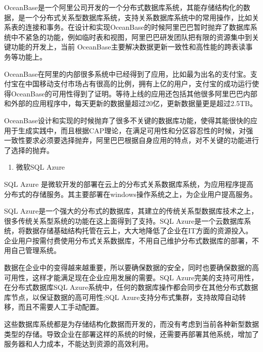 	
	OceanBase是一个阿里公司开发的一个分布式数据库系统，其能存储结构化的数据，是一个分布式关系型数据库系统，支持关系数据库系统中的常用操作，比如关系表的连接和事务。在设计和实现OceanBase的时候阿里巴巴暂时抛弃了数据库系统中不紧急的功能，例如临时表和视图，阿里巴巴研发团队把有限的资源集中到关键功能的开发上，当前 OceanBase主要解决数据更新一致性和高性能的跨表读事务等功能上。
	
	OceanBase在阿里的内部很多系统中已经得到了应用，比如最为出名的支付宝。支付宝在中国移动支付市场占有很高的比例，拥有上亿的用户，支付宝的成功运行使得OceanBase的可用性得到了证明。等待上线的应用还包括其他很多阿里巴巴内部和外部的应用程序中，每天更新的数据量超过20亿，更新数据量更是超过2.5TB。
	
	OceanBase设计和实现的时候抛弃了很多不关键的数据库功能，使得其能很快的应用于生成实践中，而且根据CAP理论，在满足可用性和分区容忍性的时候，对强一致性要求必须要选择抛弃，阿里巴巴根据自身应用的特点，对不关键的功能进行了选择的抛弃。
	
	\begin{enumerate}[resume]
		\item 微软SQL Azure
	\end{enumerate}
	
	
	SQL Azure 是微软开发的部署在云上的分布式关系数据库系统，为应用程序提高分布式的存储服务。其主要部署在windows操作系统之上，为企业用户提高服务。
	
	SQL Azure是一个强大的分布式的数据库，其建立的传统关系型数据库技术之上，很多传统关系型系统的功能在这上面得到了支持。SQL Azure是一个云数据库系统，将数据存储基础结构托管在云上，大大地降低了企业在IT方面的资源投入。企业用户按需付费使用分布式关系数据库，不用自己维护分布式数据库的部署，不用自己管理系统。
	
	数据在企业中的变得越来越重要，所以要确保数据的安全，同时也要确保数据的高可用性，这样才能满足现在企业应用发展的需要。SQL Azure完美的支持可用性，在分布式数据库SQL Azure系统中，任何的数据库操作都会同步在其他分布式数据库节点，以保证数据的高可用性;SQL Azure支持分布式集群，支持故障自动转移，而且不需要人工手动配置。
	
	这些数据库系统都是为存储结构化数据而开发的，而没有考虑到当前各种新型数据类型的存储。导致企业在部署这样的系统的时候，还需要再部署其他系统，增加了服务器和人力成本，不能达到资源的高效利用。
